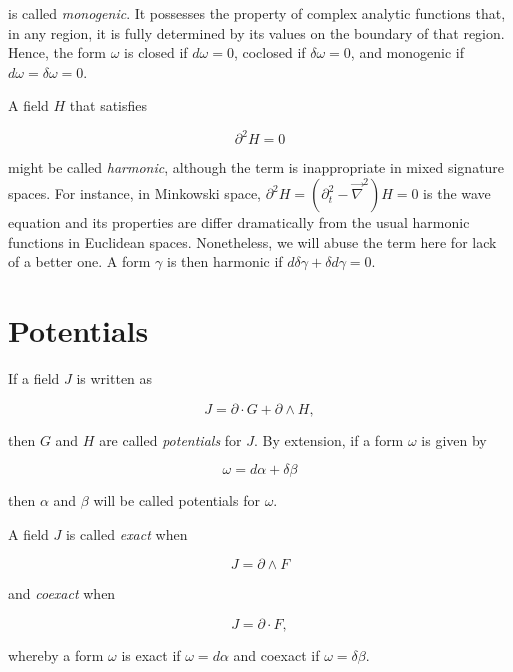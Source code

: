 \documentclass{article}
\begin{document}
is called \emph{monogenic}. It possesses the property of complex analytic functions that, in any region, it is fully determined by its values on the boundary of that region. Hence, the form $\omega$ is closed if $d \omega = 0$, coclosed if $\delta \omega = 0$, and monogenic if $d \omega = \delta \omega = 0$.

A field $H$ that satisfies

\begin{equation}
  \partial^2 H = 0
\end{equation}

might be called \emph{harmonic}, although the term is inappropriate in mixed signature spaces. For instance, in Minkowski space, $\partial^2 H = (\partial_t^2 - \vec \nabla^2) H = 0$ is the wave equation and its properties are differ dramatically from the usual harmonic functions in Euclidean spaces. Nonetheless, we will abuse the term here for lack of a better one. A form $\gamma$ is then harmonic if $d \delta \gamma + \delta d \gamma = 0$.

\section{Potentials}

If a field $J$ is written as

\begin{equation}
  J = \partial \cdot G + \partial \wedge H,
\end{equation}

then $G$ and $H$ are called \emph{potentials} for $J$. By extension, if a form $\omega$ is given by

\begin{equation}
  \omega = d \alpha + \delta \beta
\end{equation}

then $\alpha$ and $\beta$ will be called potentials for $\omega$.

A field $J$ is called \emph{exact} when

\begin{equation}
  J = \partial \wedge F
\end{equation}

and \emph{coexact} when

\begin{equation}
  J = \partial \cdot F,
\end{equation}

whereby a form $\omega$ is exact if $\omega = d \alpha$ and coexact if $\omega = \delta \beta$.
\end{document}
